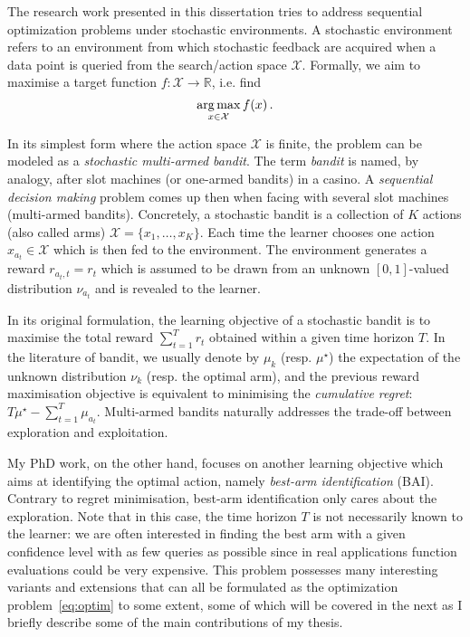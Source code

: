 The research work presented in this dissertation tries to address sequential optimization problems under stochastic environments. A stochastic environment refers to an environment from which stochastic feedback are acquired when a data point is queried from the search/action space $\mathcal{X}$. Formally, we aim to maximise a target function $f:\mathcal{X}\rightarrow\mathbb{R}$, i.e. find 
\begin{equation}\label{eq:optim}
    \operatorname*{arg\,max}_{x\in\mathcal{X}} f(x)\,.
\end{equation}

In its simplest form where the action space $\mathcal{X}$ is finite, the problem can be modeled as a \emph{stochastic multi-armed bandit}. The term \emph{bandit} is named, by analogy, after slot machines (or one-armed bandits) in a casino. A \emph{sequential decision making} problem comes up then when facing with several slot machines (multi-armed bandits). Concretely, a stochastic bandit is a collection of $K$ actions (also called arms) $\mathcal{X} = \{x_1,\ldots,x_K\}$. Each time the learner chooses one action $x_{a_t}\in\mathcal{X}$ which is then fed to the environment. The environment generates a reward $r_{a_t,t}=r_t$ which is assumed to be drawn from an unknown $[0,1]$-valued distribution $\nu_{a_t}$ and is revealed to the learner.

In its original formulation, the learning objective of a stochastic bandit is to maximise the total reward $\sum_{t=1}^T r_t$ obtained within a given time horizon $T$. In the literature of bandit, we usually denote by $\mu_k$ (resp. $\mu^\star$) the expectation of the unknown distribution $\nu_k$ (resp. the optimal arm), and the previous reward maximisation objective is equivalent to minimising the \emph{cumulative regret}: $T\mu^\star-\sum_{t=1}^T \mu_{a_t}$. %
Multi-armed bandits naturally addresses the trade-off between exploration and exploitation.

My PhD work, on the other hand, focuses on another learning objective which aims at identifying the optimal action, namely \emph{best-arm identification} (BAI). Contrary to regret minimisation, best-arm identification only cares about the exploration. Note that in this case, the time horizon $T$ is not necessarily known to the learner: we are often interested in finding the best arm with a given confidence level with as few queries as possible since in real applications function evaluations could be very expensive. This problem possesses many interesting variants and extensions that can all be formulated as the optimization problem~\eqref{eq:optim} to some extent, some of which will be covered in the next as I briefly describe some of the main contributions of my thesis.
    
